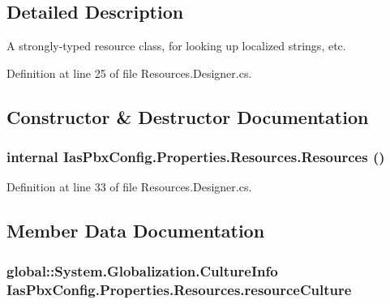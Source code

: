 \subsection{Detailed Description}
A strongly-\/typed resource class, for looking up localized strings, etc. 

Definition at line 25 of file Resources.Designer.cs.

\subsection{Constructor \& Destructor Documentation}
\hypertarget{class_ias_pbx_config_1_1_properties_1_1_resources_a23dc0b71205a7f55c05f4d132901c90d}{
\subsubsection[{Resources}]{\setlength{\rightskip}{0pt plus 5cm}internal IasPbxConfig.Properties.Resources.Resources ()}}
\label{class_ias_pbx_config_1_1_properties_1_1_resources_a23dc0b71205a7f55c05f4d132901c90d}


Definition at line 33 of file Resources.Designer.cs.

\subsection{Member Data Documentation}
\hypertarget{class_ias_pbx_config_1_1_properties_1_1_resources_a21ad6bf1177474cf320daf62f6cc6ade}{
\subsubsection[{resourceCulture}]{\setlength{\rightskip}{0pt plus 5cm}global::System.Globalization.CultureInfo {\bf IasPbxConfig.Properties.Resources.resourceCulture}}}
\label{class_ias_pbx_config_1_1_properties_1_1_resources_a21ad6bf1177474cf320daf62f6cc6ade}


